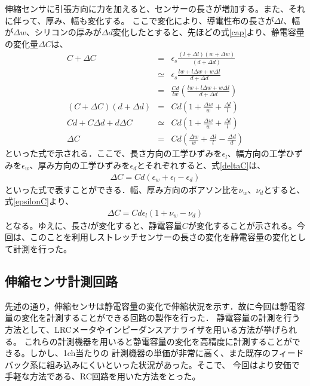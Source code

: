 伸縮センサに引張方向に力を加えると、センサーの長さが増加する。また、それに伴って、厚み、幅も変化する。
ここで変化により、導電性布の長さが$\Delta{l}$、幅が$\Delta{w}$、シリコンの厚みが$\Delta{d}$変化したとすると、先ほどの式\ref{cap}より、静電容量の変化量$\Delta{C}$は、
\begin{eqnarray}
    C+\Delta{C} &=& \epsilon{}_s\frac{(l+\Delta{l})(w+\Delta{w})}{(d+\Delta{}d)}\\
    & \simeq & \epsilon{}_s\frac{lw+l\Delta{w}+w\Delta{l}}{d+\Delta{d}}\\
    &=&\frac{Cd}{lw}\left(\frac{lw+l\Delta{w}+w\Delta{l}}{d+\Delta{d}}\right)\\
    (C+\Delta{C})(d+\Delta{d})&=&Cd\left(1+\frac{\Delta{w}}{w}+\frac{\Delta{l}}{l}\right)\\
    Cd+C\Delta{d}+d\Delta{C}& \simeq &Cd\left(1+\frac{\Delta{w}}{w}+\frac{\Delta{l}}{l}\right)\\
    \Delta{C}&=&Cd\left(\frac{\Delta{w}}{w}+\frac{\Delta{l}}{l}-\frac{\Delta{d}}{d}\right)
    \label{deltaC}
\end{eqnarray}
といった式で示される．ここで、長さ方向の工学ひずみを$\epsilon_l$、幅方向の工学ひずみを$\epsilon_w$、厚み方向の工学ひずみを$\epsilon_d$とそれぞれすると、式\ref{deltaC}は、
\begin{eqnarray}
    \Delta{C}=Cd(\epsilon_w+\epsilon_l-\epsilon_d)
    \label{epsilonC}
\end{eqnarray}
といった式で表すことができる．幅、厚み方向のポアソン比を$\nu_w$、$\nu_d$とすると、式\ref{epsilonC}より、
\begin{eqnarray}
    \Delta{C}=Cd\epsilon_l(1+\nu_w-\nu_d)
\end{eqnarray}
となる。ゆえに、長さ$l$が変化すると、静電容量$C$が変化することが示される。今回は、このことを利用しストレッチセンサーの長さの変化を静電容量の変化として計測を行った。

\subsection{伸縮センサ計測回路}
先述の通り，伸縮センサは静電容量の変化で伸縮状況を示す．故に今回は静電容量の変化を計測することができる回路の製作を行った．
静電容量の計測を行う方法として、LRCメータやインピーダンスアナライザを用いる方法が挙げられる。
これらの計測機器を用いると静電容量の変化を高精度に計測することができる。しかし、1ch当たりの
計測機器の単価が非常に高く、また既存のフィードバック系に組み込みにくいといった状況があった。そこで、
今回はより安価で手軽な方法である、RC回路を用いた方法をとった。

